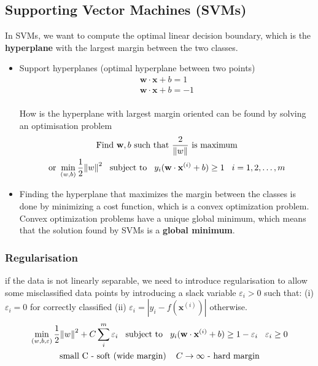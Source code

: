 \documentclass[a4paper,10pt]{article}
\begin{document}
\subsection{Supporting Vector Machines (SVMs)}
In SVMs, we want to compute the optimal linear decision boundary, which is the \textbf{hyperplane} with the largest margin between the two classes.
\begin{itemize}
    \item Support hyperplanes (optimal hyperplane between two points)
    \begin{gather*}
        \mathbf{w}\cdot\mathbf{x} + b = 1\\
        \mathbf{w}\cdot\mathbf{x} + b = -1\\
    \end{gather*}

    \vspace*{-0.8cm}
    How is the hyperplane with largest margin oriented can be found by solving an optimisation problem
    \begin{gather*}
        \text{Find }\mathbf{w},b\text{ such that }\frac{2}{\lVert w \rVert}\text{ is maximum}\\
        \text{or }\min\limits_{(w,b)}\frac{1}{2}{\lVert w \rVert}^2\hspace*{0.3cm}\text{subject to}\hspace*{0.3cm}y_i(\mathbf{w}\cdot\mathbf{x}^{(i)}+b)\geq1\hspace*{0.3cm}i = 1,2,\dots,m
    \end{gather*}
    \item Finding the hyperplane that maximizes the margin between the classes is done by minimizing a cost function, which is a convex optimization problem. Convex optimization problems have a unique global minimum, which means that the solution found by SVMs is a \textbf{global minimum}.
\end{itemize}

\subsubsection{Regularisation}
if the data is not linearly separable, we need to introduce regularisation to allow some misclassified data points by introducing a slack variable $\varepsilon_i>0$ such that: (i) $\varepsilon_i=0$ for correctly classified (ii) $\varepsilon_i=\left| y_i-f(\mathbf{x}^{(i)})\right|$ otherwise. 
\begin{gather*}
    \min\limits_{(w,b,\varepsilon)}\frac{1}{2}{\lVert w \rVert}^2+C\sum_{i}^{m}\varepsilon_i\hspace*{0.3cm}\text{subject to}\hspace*{0.3cm}y_i(\mathbf{w}\cdot\mathbf{x}^{(i)}+b)\geq1-\varepsilon_i\hspace*{0.3cm}\varepsilon_i\geq0\\
    \text{small C - soft (wide margin)}\hspace*{0.4cm}C\rightarrow\infty\text{ - hard margin}
\end{gather*}
\end{document}
